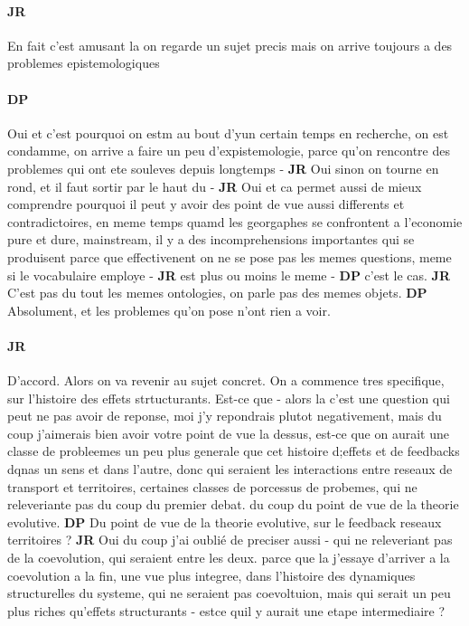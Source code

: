 \documentclass[12pt]{article}
\begin{document}
\paragraph{JR}

En fait c'est amusant la on regarde un sujet precis mais on arrive toujours a des problemes epistemologiques

\paragraph{DP}

Oui et c'est pourquoi on estm au bout d'yun certain temps en recherche, on est condamme, on arrive a faire un peu d'expistemologie, parce qu'on rencontre des problemes qui ont ete souleves depuis longtemps - \textbf{JR} Oui sinon on tourne en rond, et il faut sortir par le haut du - \textbf{JR} Oui et ca permet aussi de mieux comprendre pourquoi il peut y avoir des point de vue aussi differents et contradictoires, en meme temps quamd les georgaphes se confrontent a l'economie pure et dure, mainstream, il y a des incomprehensions importantes qui se produisent parce que effectivenent on ne se pose pas les memes questions, meme si le vocabulaire employe - \textbf{JR} est plus ou moins le meme - \textbf{DP} c'est le cas. \textbf{JR} C'est pas du tout les memes ontologies, on parle pas des memes objets. \textbf{DP} Absolument, et les problemes qu'on pose n'ont rien a voir.


\paragraph{JR}

D'accord. Alors on va revenir au sujet concret. On a commence tres specifique, sur l'histoire des effets strtucturants. Est-ce que - alors la c'est une question qui peut ne pas avoir de reponse, moi j'y repondrais plutot negativement, mais du coup j'aimerais bien avoir votre point de vue la dessus, est-ce que on aurait une classe de probleemes un peu plus generale que cet histoire d;effets et de feedbacks dqnas un sens et dans l'autre, donc qui seraient les interactions entre reseaux de transport et territoires, certaines classes de porcessus de probemes, qui ne releveriante pas du coup du premier debat. du coup du point de vue de la theorie evolutive. \textbf{DP} Du point de vue de la theorie evolutive, sur le feedback reseaux territoires ? \textbf{JR} Oui du coup j'ai oublié de preciser aussi - qui ne releveriant pas de la coevolution, qui seraient entre les deux. parce que la j'essaye d'arriver a la coevolution a la fin, une vue plus integree, dans l'histoire des dynamiques structurelles du systeme, qui ne seraient pas coevoltuion, mais qui serait un peu plus riches qu'effets structurants - estce quil y aurait une etape intermediaire ?
\end{document}
